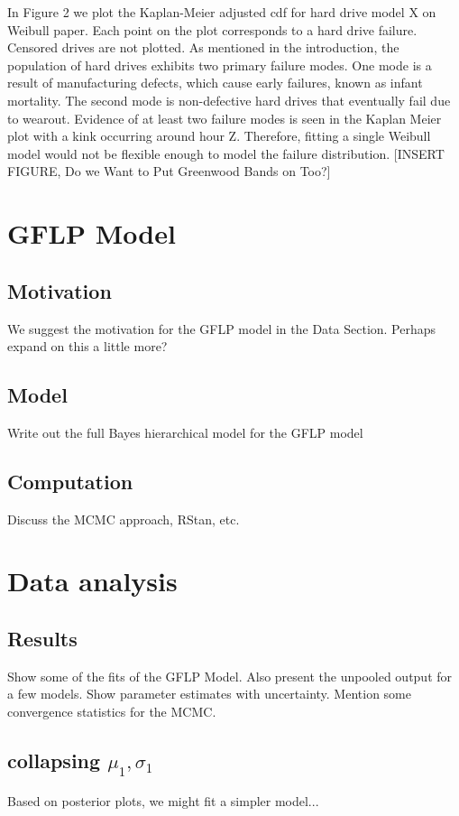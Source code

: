\documentclass[12pt]{article}
\begin{document}
In Figure 2 we plot the Kaplan-Meier adjusted cdf for hard drive model X on Weibull paper.  Each point on the plot corresponds to a hard drive failure.  Censored drives are not plotted.  As mentioned in the introduction, the population of hard drives exhibits two primary failure modes.  One mode is a result of manufacturing defects, which cause early failures, known as infant mortality.  The second mode is non-defective hard drives that eventually fail due to wearout.   Evidence of at least two failure modes is seen in the Kaplan Meier plot with a kink occurring around hour Z.  Therefore, fitting a single Weibull model would not be flexible enough to model the failure distribution.     [INSERT FIGURE, Do we Want to Put Greenwood Bands on Too?]


\section{GFLP Model}
\subsection{Motivation}
We suggest the motivation for the GFLP model in the Data Section.  Perhaps expand on this a little more?

\subsection{Model}
Write out the full Bayes hierarchical model for the GFLP model

\subsection{Computation}
Discuss the MCMC approach, RStan, etc.

\section{Data analysis}
\subsection{Results}
Show some of the fits of the GFLP Model.  Also present the unpooled output for a few models.  Show parameter estimates with uncertainty. Mention some convergence statistics for the MCMC. 
\subsection{collapsing $\mu_1, \sigma_1$}
Based on posterior plots, we might fit a simpler model...
\end{document}
